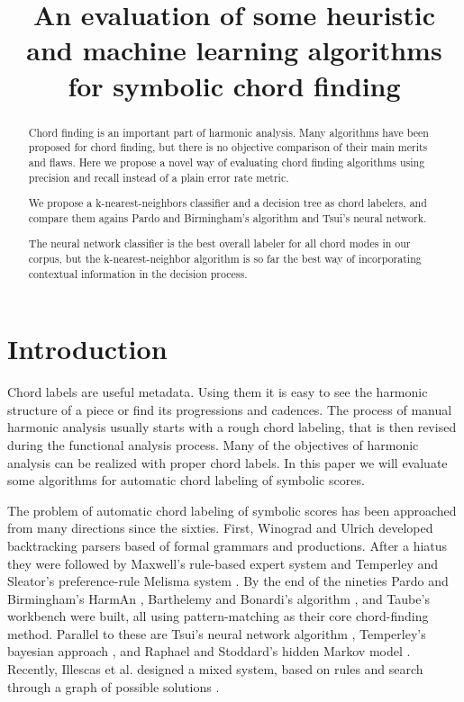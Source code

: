 \documentclass{article}
\title{An evaluation of some heuristic and machine learning algorithms for
  symbolic chord finding} \oneauthor {}{}
\begin{document}
\graphicspath{{figs/}{data/}}
\maketitle

\begin{abstract}

  Chord finding is an important part of harmonic analysis. Many
  algorithms have been proposed for chord finding, but there is no
  objective comparison of their main merits and flaws. Here we propose
  a novel way of evaluating chord finding algorithms using precision
  and recall instead of a plain error rate metric.
  
  We propose a k-nearest-neighbors classifier and a decision tree as
  chord labelers, and compare them agains Pardo and Birmingham's
  algorithm and Tsui's neural network.
  
  The neural network classifier is the best overall labeler for all
  chord modes in our corpus, but the k-nearest-neighbor algorithm is
  so far the best way of incorporating contextual information in the
  decision process.


\end{abstract}

\section{Introduction}
\label{sec:introduction}

Chord labels are useful metadata. Using them it is easy to see the
harmonic structure of a piece or find its progressions and
cadences. The process of manual harmonic analysis usually starts with
a rough chord labeling, that is then revised during the functional
analysis process. Many of the objectives of harmonic analysis can be
realized with proper chord labels. In this paper we will evaluate some
algorithms for automatic chord labeling of symbolic scores.

The problem of automatic chord labeling of symbolic scores has been
approached from many directions since the sixties. First, Winograd
\cite{winograd68:linguistics} and Ulrich \cite{ulrich77:analysis}
developed backtracking parsers based of formal grammars and
productions. After a hiatus they were followed by Maxwell's
\cite{maxwell92:expert} rule-based expert system and Temperley and
Sleator's preference-rule Melisma system
\cite{temperley.ea99:modeling}. By the end of the nineties Pardo and
Birmingham's HarmAn \cite{barthelemy.ea01:figured}, Barthelemy and
Bonardi's algorithm \cite{pardo.ea02:algorithms}, and Taube's
workbench \cite{taube99:automatic} were built, all using
pattern-matching as their core chord-finding method. Parallel to these
are Tsui's neural network algorithm \cite{tsui02:harmonic}, Temperley's
bayesian approach \cite{temperley04:bayesian}, and Raphael and
Stoddard's hidden Markov model \cite{raphael.ea03:harmonic}. Recently,
Illescas et al. designed a mixed system, based on rules and search
through a graph of possible solutions \cite{illescas.ea07:harmonic}.
\end{document}
